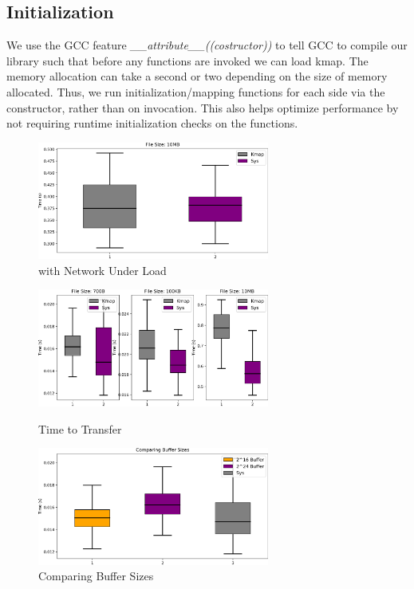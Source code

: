 \subsection{Initialization}\label{subsec:initialization}
We use the GCC feature \textit{\_\_attribute\_\_((costructor))} to tell GCC to compile our library such that before any functions are invoked we can load kmap.
The memory allocation can take a second or two depending on the size of memory allocated.
Thus, we run initialization/mapping functions for each side via the constructor, rather than on invocation.
This also helps optimize performance by not requiring runtime initialization checks on the functions.

\begin{figure}[!htb]
    \begin{minipage}{0.5\textwidth}
        \centering
        \includegraphics[keepaspectratio=true,width=3in]{figures/evaluation/netload.png}
        \caption{\sysname with Network Under Load}
        \label{fig:netload}
    \end{minipage}%
\end{figure}


\begin{figure}[!htb]
    \begin{minipage}{0.5\textwidth}
        \centering
        \includegraphics[keepaspectratio=true,width=3in]{figures/evaluation/results.png}
        \caption{Time to Transfer}
        \label{fig:results}
    \end{minipage}%
    \begin{minipage}{0.5\textwidth}
        \centering
        \includegraphics[keepaspectratio=true,width=3in]{figures/evaluation/buf_compare.png}
        \caption{Comparing \sysname Buffer Sizes}
        \label{fig:buf}
    \end{minipage}%
\end{figure}